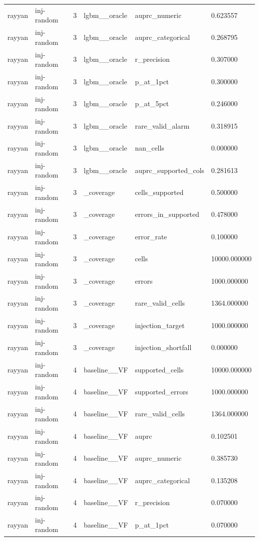\begin{tabular}{llllll}
rayyan & inj-random & 3 & lgbm\_\_oracle & auprc\_numeric & 0.623557 \\
rayyan & inj-random & 3 & lgbm\_\_oracle & auprc\_categorical & 0.268795 \\
rayyan & inj-random & 3 & lgbm\_\_oracle & r\_precision & 0.307000 \\
rayyan & inj-random & 3 & lgbm\_\_oracle & p\_at\_1pct & 0.300000 \\
rayyan & inj-random & 3 & lgbm\_\_oracle & p\_at\_5pct & 0.246000 \\
rayyan & inj-random & 3 & lgbm\_\_oracle & rare\_valid\_alarm & 0.318915 \\
rayyan & inj-random & 3 & lgbm\_\_oracle & nan\_cells & 0.000000 \\
rayyan & inj-random & 3 & lgbm\_\_oracle & auprc\_supported\_cols & 0.281613 \\
rayyan & inj-random & 3 & \_coverage & cells\_supported & 0.500000 \\
rayyan & inj-random & 3 & \_coverage & errors\_in\_supported & 0.478000 \\
rayyan & inj-random & 3 & \_coverage & error\_rate & 0.100000 \\
rayyan & inj-random & 3 & \_coverage & cells & 10000.000000 \\
rayyan & inj-random & 3 & \_coverage & errors & 1000.000000 \\
rayyan & inj-random & 3 & \_coverage & rare\_valid\_cells & 1364.000000 \\
rayyan & inj-random & 3 & \_coverage & injection\_target & 1000.000000 \\
rayyan & inj-random & 3 & \_coverage & injection\_shortfall & 0.000000 \\
rayyan & inj-random & 4 & baseline\_\_VF & supported\_cells & 10000.000000 \\
rayyan & inj-random & 4 & baseline\_\_VF & supported\_errors & 1000.000000 \\
rayyan & inj-random & 4 & baseline\_\_VF & rare\_valid\_cells & 1364.000000 \\
rayyan & inj-random & 4 & baseline\_\_VF & auprc & 0.102501 \\
rayyan & inj-random & 4 & baseline\_\_VF & auprc\_numeric & 0.385730 \\
rayyan & inj-random & 4 & baseline\_\_VF & auprc\_categorical & 0.135208 \\
rayyan & inj-random & 4 & baseline\_\_VF & r\_precision & 0.070000 \\
rayyan & inj-random & 4 & baseline\_\_VF & p\_at\_1pct & 0.070000 \\

\end{tabular}
